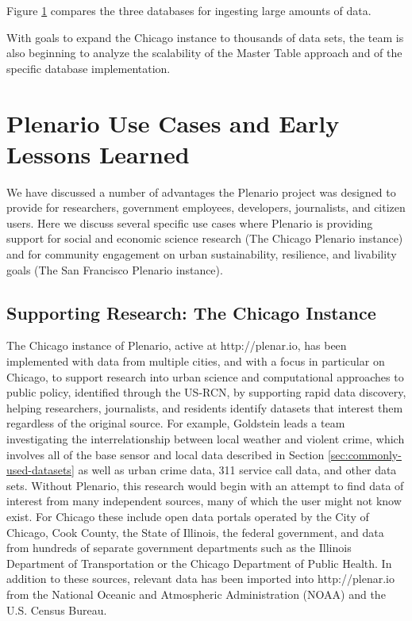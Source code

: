 \documentclass[11pt]{article}
\begin{document}
Figure \ref{} compares the three databases for ingesting large amounts of data. 

With goals to expand the Chicago instance to thousands of data sets, the team is also beginning to analyze the scalability of the Master Table approach and of the specific database implementation.


\section{Plenario Use Cases and Early Lessons Learned}
We have discussed a number of advantages the Plenario project was designed to provide for researchers, government employees, developers, journalists, and citizen users. Here we discuss several specific use cases where Plenario is providing support for social and economic science research (The Chicago Plenario instance) and for community engagement on urban sustainability, resilience, and livability goals (The San Francisco Plenario instance). 

\subsection{\textbf{Supporting Research: The Chicago Instance}}\label{chicago-instance}
The Chicago instance of Plenario, active at http://plenar.io, has been implemented with data from multiple cities, and with a focus in particular on Chicago, to support research\textit{ }into urban science and computational approaches to public policy, identified through the US-RCN, by supporting rapid data discovery, helping researchers, journalists, and residents identify datasets that interest them regardless of the original source. For example, Goldstein leads a team investigating the interrelationship between local weather and violent crime, which involves all of the base sensor and local data described in Section \ref{sec:commonly-used-datasets} as well as urban crime data, 311 service call data, and other data sets. Without Plenario, this research would begin with an attempt to find data of interest from many independent sources, many of which the user might not know exist. For Chicago these include open data portals operated by the City of Chicago, Cook County, the State of Illinois, the federal government, and data from hundreds of separate government departments such as the Illinois Department of Transportation or the Chicago Department of Public Health. In addition to these sources, relevant data has been imported into http://plenar.io from the National Oceanic and Atmospheric Administration (NOAA) and the U.S. Census Bureau. 
\end{document}
